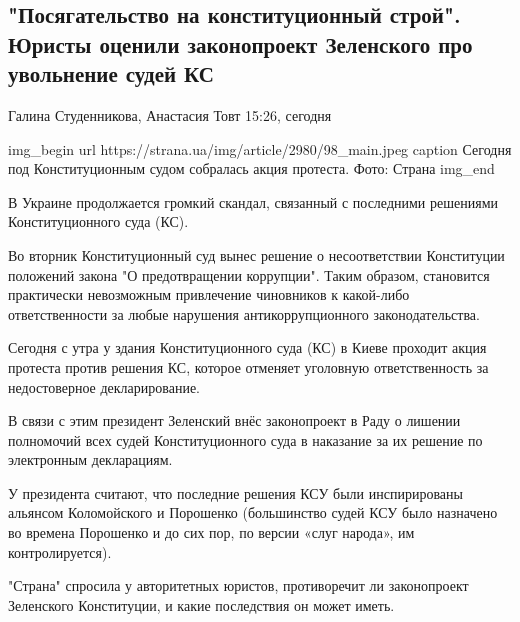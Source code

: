  
 
 

\subsection{"Посягательство на конституционный строй". Юристы оценили законопроект Зеленского про увольнение судей КС}


Галина Студенникова, Анастасия Товт 15:26, сегодня 

\ifcmt
img_begin 
	url https://strana.ua/img/article/2980/98_main.jpeg
	caption Сегодня под Конституционным судом собралась акция протеста. Фото: Страна 
img_end
\fi

В Украине продолжается громкий скандал, связанный с последними решениями
Конституционного суда (КС). 

Во вторник Конституционный суд вынес решение о несоответствии Конституции
положений закона "О предотвращении коррупции". Таким образом, становится
практически невозможным привлечение чиновников к какой-либо
ответственности за любые нарушения антикоррупционного законодательства.
 
Сегодня с утра у здания Конституционного суда (КС) в Киеве проходит акция
протеста против решения КС, которое отменяет уголовную ответственность за
недостоверное декларирование.
 
В связи с этим президент Зеленский внёс законопроект в Раду о лишении
полномочий всех судей Конституционного суда в наказание за их решение по
электронным декларациям.
 
У президента считают, что последние решения КСУ были инспирированы
альянсом Коломойского и Порошенко (большинство судей КСУ было назначено во
времена Порошенко и до сих пор, по версии «слуг народа», им
контролируется).
 
"Страна" спросила у авторитетных юристов, противоречит ли законопроект
Зеленского Конституции, и какие последствия он может иметь.


